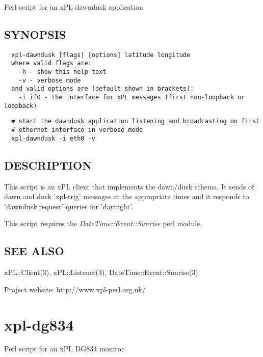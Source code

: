 \documentclass[12pt,a4paper]{article}
\begin{document}
Perl script for an xPL dawndusk application

\subsection*{SYNOPSIS\label{xpl-dawndusk_SYNOPSIS}}
\begin{verbatim}
  xpl-dawndusk [flags] [options] latitude longitude
  where valid flags are:
    -h - show this help text
    -v - verbose mode
  and valid options are (default shown in brackets):
    -i if0 - the interface for xPL messages (first non-loopback or loopback)
\end{verbatim}
\begin{verbatim}
  # start the dawndusk application listening and broadcasting on first
  # ethernet interface in verbose mode
  xpl-dawndusk -i eth0 -v
\end{verbatim}
\subsection*{DESCRIPTION\label{xpl-dawndusk_DESCRIPTION}}


This script is an xPL client that implements the dawn/dusk schema.
It sends of dawn and dusk 'xpl-trig' messages at the appropriate times
and it responds to 'dawndusk.request' queries for 'daynight'.



This script requires the \emph{DateTime::Event::Sunrise} perl module.

\subsection*{SEE ALSO\label{xpl-dawndusk_SEE_ALSO}}


xPL::Client(3), xPL::Listener(3), DateTime::Event::Sunrise(3)



Project website: http://www.xpl-perl.org.uk/

\newpage
\section{xpl-dg834\label{xpl-dg834}}


Perl script for an xPL DG834 monitor
\end{document}
